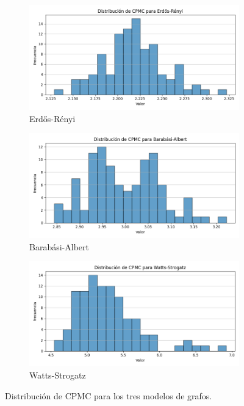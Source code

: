 \documentclass[12pt]{book}
\begin{document}
\begin{figure}[ht!]
\centering
\begin{subfigure}{.32\textwidth}
  \centering
  \includegraphics[width=\linewidth]{images/cpmc_er.png}
  \caption{Erdős-Rényi}
\end{subfigure}%
\begin{subfigure}{.32\textwidth}
  \centering
  \includegraphics[width=\linewidth]{images/cpmc_ba.png}
  \caption{Barabási-Albert}
\end{subfigure}
\begin{subfigure}{.32\textwidth}
  \centering
  \includegraphics[width=\linewidth]{images/cpmc_ws.png}
  \caption{Watts-Strogatz}
\end{subfigure}
\caption{Distribución de CPMC para los tres modelos de grafos.}
\end{figure}
\end{document}
